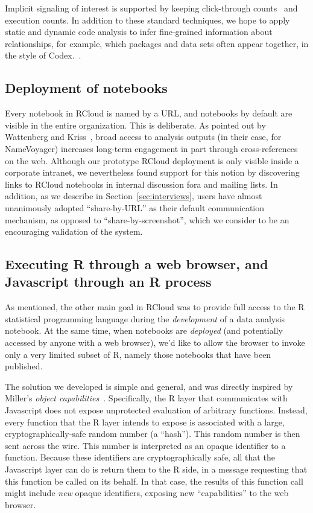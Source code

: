 Implicit signaling of interest is supported by keeping click-through
counts~\cite{Joachims:2005:AIC} and execution counts. In addition to
these standard techniques, we hope to apply static and dynamic code
analysis to infer fine-grained information about relationships,
for example, which packages and data sets often appear together,
in the style of Codex.~\cite{Fast:2014:ECS}.

\subsection{Deployment of notebooks\label{sec:deployment}}

Every notebook in RCloud is named by a URL, and notebooks by default
are visible in the entire organization. This is deliberate.
As pointed out by Wattenberg and Kriss~\cite{Wattenberg:2011:DFS},
broad access to analysis outputs (in their case, for NameVoyager) increases
long-term engagement in part through cross-references on the
web. Although our prototype RCloud deployment is only visible inside a
corporate intranet, we nevertheless found support for this notion by
discovering links to RCloud notebooks in internal discussion fora and
mailing lists. In addition, as we describe in
Section~\ref{sec:interviews}, users have almost unanimously adopted
``share-by-URL'' as their default communication mechanism, as opposed
to ``share-by-screenshot'', which we consider to be an encouraging
validation of the system.

\subsection{Executing R through a web browser, and Javascript through an R process\label{sec:Rinbrowser}}

As mentioned, the other main goal in RCloud was to provide
full access to the R statistical programming language during the
\emph{development} of a data analysis notebook.
At the same time, when notebooks are \emph{deployed} (and potentially
accessed by anyone with a web browser), we'd like to allow the
browser to invoke only a very limited subset of R, namely those
notebooks that have been published.

The solution we developed is simple and general, and was directly
inspired by Miller's \emph{object
  capabilities}~\cite{Miller:2006:RCT}. Specifically, the R layer that
communicates with Javascript does not expose unprotected evaluation of
arbitrary functions. Instead, every function that the R layer intends
to expose is associated with a large, cryptographically-safe random
number (a ``hash''). This random number is then sent
across the wire. This number is interpreted as an opaque identifier to
a function. Because these identifiers are cryptographically safe, all
that the Javascript layer can do is return them to the R side, in a
message requesting that this function be called on its behalf. In that
case, the results of this function call might include \emph{new}
opaque identifiers, exposing new ``capabilities'' to the web browser.

